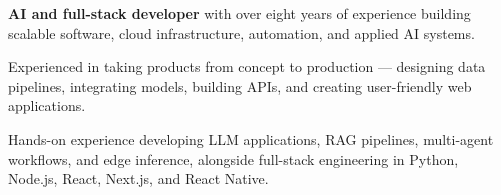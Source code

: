 
\begin{zitemize}
\item \textbf{AI and full-stack developer} with over eight years of experience building scalable software, cloud infrastructure, automation, and applied AI systems.
\item Experienced in taking products from concept to production --- designing data pipelines, integrating models, building APIs, and creating user-friendly web applications.
\item Hands-on experience developing LLM applications, RAG pipelines, multi-agent workflows, and edge inference, alongside full-stack engineering in Python, Node.js, React, Next.js, and React Native.
\end{zitemize}
